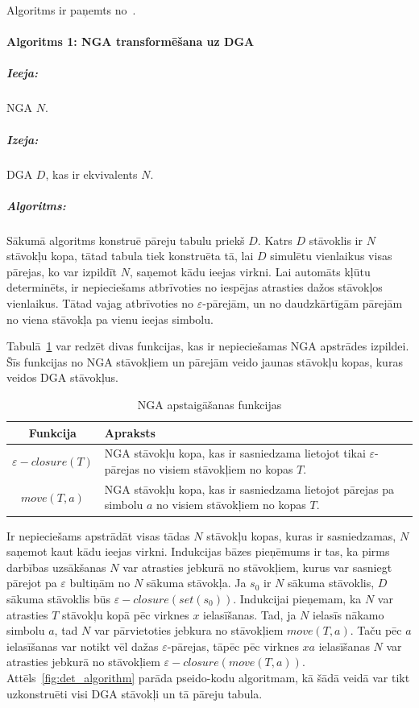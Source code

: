 Algoritms ir paņemts no~\cite{DragonBook}.

\paragraph*{Algoritms 1: NGA transformēšana uz DGA}
\subparagraph{Ieeja:}NGA $N$.
\subparagraph{Izeja:}DGA $D$, kas ir ekvivalents $N$.
\subparagraph{Algoritms:} Sākumā algoritms konstruē pāreju tabulu priekš $D$. Katrs $D$ stāvoklis ir $N$ stāvokļu kopa, tātad tabula tiek konstruēta tā, lai $D$ simulētu vienlaikus visas pārejas, ko var izpildīt $N$, saņemot kādu ieejas virkni. Lai automāts kļūtu determinēts, ir nepieciešams atbrīvoties no iespējas atrasties dažos stāvokļos vienlaikus. Tātad vajag atbrīvoties no $\varepsilon$-pārejām, un no daudzkārtīgām pārejām no viena stāvokļa pa vienu ieejas simbolu.

Tabulā~\ref{fig:NGAoperations} var redzēt divas funkcijas, kas ir nepieciešamas NGA apstrādes izpildei. Šīs funkcijas no NGA stāvokļiem un pārejām veido jaunas stāvokļu kopas, kuras veidos DGA stāvokļus.

\begin{table}[H]
  \caption{NGA apstaigāšanas funkcijas}
  \centering
  \begin{tabular}{|c|p{350pt}|}
    \hline
    Funkcija & Apraksts \\ \hline
    $\varepsilon-closure (T)$ & 
    NGA stāvokļu kopa, kas ir sasniedzama lietojot tikai $\varepsilon$-pārejas no visiem stāvokļiem no kopas $T$. \\ \hline
    $move (T, a)$ & 
    NGA stāvokļu kopa, kas ir sasniedzama lietojot pārejas pa simbolu $a$ no visiem stāvokļiem no kopas $T$. \\
    \hline
  \end{tabular}
\label{fig:NGAoperations}
\end{table}

Ir nepieciešams apstrādāt visas tādas $N$ stāvokļu kopas, kuras ir sasniedzamas, $N$ saņemot kaut kādu ieejas virkni. Indukcijas bāzes pieņēmums ir tas, ka pirms darbības uzsākšanas $N$ var atrasties jebkurā no stāvokļiem, kurus var sasniegt pārejot pa $\varepsilon$ bultiņām no $N$ sākuma stāvokļa. Ja $s_0$ ir $N$ sākuma stāvoklis, $D$ sākuma stāvoklis būs $\varepsilon-closure (set (s_0))$. Indukcijai pieņemam, ka $N$ var atrasties $T$ stāvokļu kopā pēc virknes $x$ ielasīšanas. Tad, ja $N$ ielasīs nākamo simbolu $a$, tad $N$ var pārvietoties jebkura no stāvokļiem $move (T, a)$. Taču pēc $a$ ielasīšanas var notikt vēl dažas $\varepsilon$-pārejas, tāpēc pēc virknes $xa$ ielasīšanas $N$ var atrasties jebkurā no stāvokļiem $\varepsilon-closure (move (T, a))$. Attēls~\ref{fig:det_algorithm} parāda pseido-kodu algoritmam, kā šādā veidā var tikt uzkonstruēti visi DGA stāvokļi un tā pāreju tabula.

